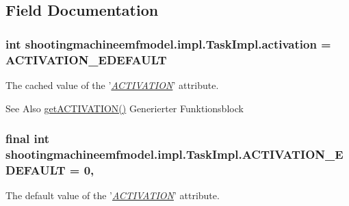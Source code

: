 \subsection{Field Documentation}
\hypertarget{classshootingmachineemfmodel_1_1impl_1_1_task_impl_a71b95de4d8769109b08e6a55b2d413c1}{
\subsubsection[{activation}]{\setlength{\rightskip}{0pt plus 5cm}int shootingmachineemfmodel.\-impl.\-Task\-Impl.\-activation = {\bf A\-C\-T\-I\-V\-A\-T\-I\-O\-N\-\_\-\-E\-D\-E\-F\-A\-U\-L\-T}\hspace{0.3cm}{\ttfamily [protected]}}}\label{classshootingmachineemfmodel_1_1impl_1_1_task_impl_a71b95de4d8769109b08e6a55b2d413c1}
The cached value of the '\hyperlink{classshootingmachineemfmodel_1_1impl_1_1_task_impl_a7d652c92762b3e960b4fc28dacd002d0}{{\itshape A\-C\-T\-I\-V\-A\-T\-I\-O\-N}}' attribute.

\begin{DoxySeeAlso}{See Also}
\hyperlink{classshootingmachineemfmodel_1_1impl_1_1_task_impl_a7d652c92762b3e960b4fc28dacd002d0}{get\-A\-C\-T\-I\-V\-A\-T\-I\-O\-N()} Generierter Funktionsblock  
\end{DoxySeeAlso}
\hypertarget{classshootingmachineemfmodel_1_1impl_1_1_task_impl_a1091e4f368608ccd335964978b9ba4dc}{
\subsubsection[{A\-C\-T\-I\-V\-A\-T\-I\-O\-N\-\_\-\-E\-D\-E\-F\-A\-U\-L\-T}]{\setlength{\rightskip}{0pt plus 5cm}final int shootingmachineemfmodel.\-impl.\-Task\-Impl.\-A\-C\-T\-I\-V\-A\-T\-I\-O\-N\-\_\-\-E\-D\-E\-F\-A\-U\-L\-T = 0\hspace{0.3cm}{\ttfamily [static]}, {\ttfamily [protected]}}}\label{classshootingmachineemfmodel_1_1impl_1_1_task_impl_a1091e4f368608ccd335964978b9ba4dc}
The default value of the '\hyperlink{classshootingmachineemfmodel_1_1impl_1_1_task_impl_a7d652c92762b3e960b4fc28dacd002d0}{{\itshape A\-C\-T\-I\-V\-A\-T\-I\-O\-N}}' attribute.

